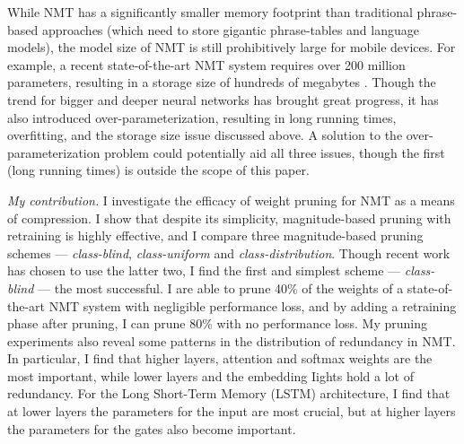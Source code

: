 


While NMT has a significantly smaller memory footprint than traditional phrase-based approaches (which need to store gigantic phrase-tables and
language models), the model size of NMT is still prohibitively large for mobile devices.
For example, a recent state-of-the-art NMT system requires over 200 million
parameters, resulting in a storage size of hundreds of megabytes
\cite{luong15attn}. 
Though the trend for bigger and deeper neural networks has brought great progress, it has also introduced over-parameterization, resulting in long running times, overfitting, and the storage size issue discussed above. 
A solution to the over-parameterization problem could potentially aid all three issues, though the first (long running times) is outside the scope of this paper.

{\it My contribution.}
I investigate the efficacy of weight pruning for NMT as a means of compression.
I show that despite its simplicity, magnitude-based pruning with retraining is highly effective, and I compare three magnitude-based pruning schemes --- \textit{class-blind}, \textit{class-uniform} and \textit{class-distribution}.
Though recent work has chosen to use the latter two, I find the first and simplest scheme --- \textit{class-blind} --- the most successful.
I are able to prune 40\% of the weights of a state-of-the-art NMT system with negligible performance loss, and by adding a retraining phase after pruning, I can prune 80\% with no performance loss.
My pruning experiments also reveal some patterns in the distribution of
redundancy in NMT. In particular, I find that higher layers, attention and softmax weights are the most important, while lower layers and the embedding Iights hold a lot of redundancy. 
For the Long Short-Term Memory (LSTM) architecture, I find that at lower layers the parameters for the input are most crucial, but at higher layers the parameters for the gates also become important.
